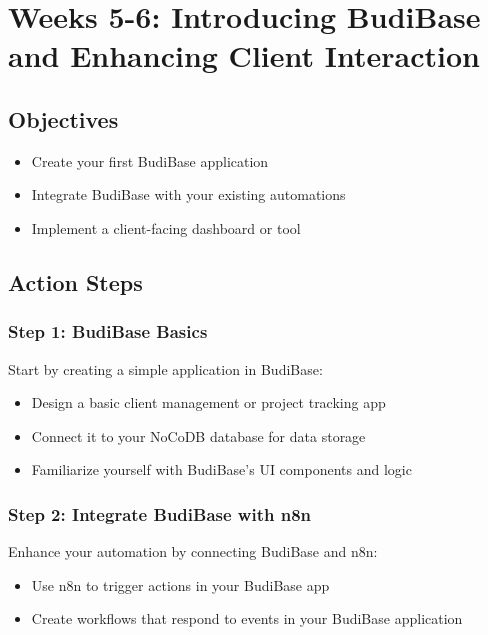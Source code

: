 \section{Weeks 5-6: Introducing BudiBase and Enhancing Client Interaction}

\subsection{Objectives}
\begin{itemize}
    \item Create your first BudiBase application
    \item Integrate BudiBase with your existing automations
    \item Implement a client-facing dashboard or tool
\end{itemize}

\subsection{Action Steps}

\subsubsection{Step 1: BudiBase Basics}
Start by creating a simple application in BudiBase:

\begin{itemize}
    \item Design a basic client management or project tracking app
    \item Connect it to your NoCoDB database for data storage
    \item Familiarize yourself with BudiBase's UI components and logic
\end{itemize}


\subsubsection{Step 2: Integrate BudiBase with n8n}
Enhance your automation by connecting BudiBase and n8n:

\begin{itemize}
    \item Use n8n to trigger actions in your BudiBase app
    \item Create workflows that respond to events in your BudiBase application
\end{itemize}

